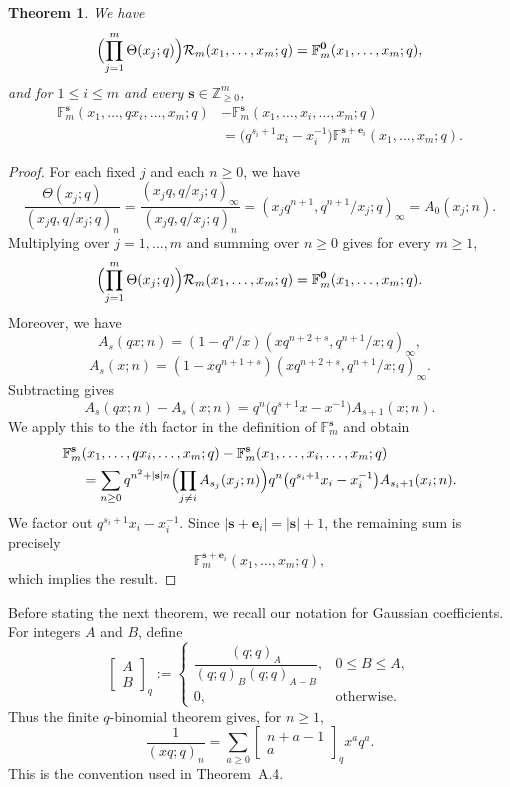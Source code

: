 \documentclass[12pt]{amsart}
\numberwithin{equation}{section}
\newtheorem{theorem}{Theorem}[section]
\newcommand{\ZZ}{\mathbb Z}
\newcommand{\FF}{\mathbb F}
\begin{document}
\begin{theorem}
  We have
\[
\Bigl(\prod_{j=1}^m \Theta(x_j;q)\Bigr)\mathcal{R}_m(x_1,\dots,x_m;q)=\FF_m^{\mathbf 0}(x_1,\dots,x_m;q),
\]
and for $1\le i\le m$ and every $\mathbf s\in\ZZ_{\ge 0}^m$,
\[
\begin{aligned}
\FF_m^{\mathbf s}(x_1,\dots,qx_i,\dots,x_m;q)&-\FF_m^{\mathbf s}(x_1,\dots,x_i,\dots,x_m;q) \\
&=\bigl(q^{s_i+1}x_i-x_i^{-1}\bigr)\FF_m^{\mathbf s+\mathbf e_i}(x_1,\dots,x_m;q).
\end{aligned}
\]
\end{theorem}
\begin{proof}
      For each fixed $j$ and each $n\ge 0$, we have
\[
\frac{\Theta(x_j;q)}{(x_jq,q/x_j;q)_n}
=
\frac{(x_jq,q/x_j;q)_\infty}{(x_jq,q/x_j;q)_n}
=(x_jq^{n+1},q^{n+1}/x_j;q)_\infty
=A_0(x_j;n).
\]
Multiplying over $j=1,\dots,m$ and summing over $n\ge 0$ gives for every $m\ge 1$,
\[
\Bigl(\prod_{j=1}^m \Theta(x_j;q)\Bigr)\mathcal{R}_m(x_1,\dots,x_m;q)=\FF_m^{\mathbf 0}(x_1,\dots,x_m;q).
\]
Moreover, we have
\[
A_s(qx;n)=(1-q^n/x)(xq^{n+2+s},q^{n+1}/x;q)_\infty,
\]
\[
A_s(x;n)=(1-xq^{n+1+s})(xq^{n+2+s},q^{n+1}/x;q)_\infty.
\]
Subtracting gives
\[
A_s(qx;n)-A_s(x;n)=q^n\bigl(q^{s+1}x-x^{-1}\bigr)A_{s+1}(x;n).
\]
We apply this to the $i$th factor in the definition of $\FF_m^{\mathbf s}$ and obtain
\begin{align*}
\FF_m^{\mathbf s}&(x_1,\dots,qx_i,\dots,x_m;q)-\FF_m^{\mathbf s}(x_1,\dots,x_i,\dots,x_m;q)
\\
&=\sum_{n\ge 0} q^{n^2+|\mathbf s|n}
\Bigl(\prod_{j\neq i}A_{s_j}(x_j;n)\Bigr)
q^n\bigl(q^{s_i+1}x_i-x_i^{-1}\bigr)A_{s_i+1}(x_i;n).
\end{align*}
We factor out $q^{s_i+1}x_i-x_i^{-1}$. Since $|\mathbf s+\mathbf e_i|=|\mathbf s|+1$, the remaining sum is precisely
\[
\FF_m^{\mathbf s+\mathbf e_i}(x_1,\dots,x_m;q),
\]
which implies the result.
\end{proof}

Before stating the next theorem, we recall our notation for Gaussian coefficients. For integers
\(A\) and \(B\), define
\[
\begin{bmatrix} A \\ B \end{bmatrix}_q
:=
\begin{cases}
\dfrac{(q;q)_A}{(q;q)_B(q;q)_{A-B}}, & 0 \leq B \leq A,\\[1.2em]
0, & \text{otherwise}.
\end{cases}
\]
Thus the finite \(q\)-binomial theorem gives, for \(n\geq 1\),
\[
\frac{1}{(xq;q)_n}
=
\sum_{a\geq 0}
\begin{bmatrix} n+a-1 \\ a \end{bmatrix}_q
x^a q^a.
\]
This is the convention used in Theorem~A.4.
\end{document}
